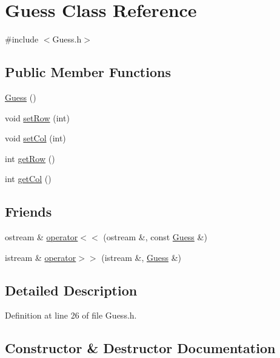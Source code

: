 \hypertarget{class_guess}{}\section{Guess Class Reference}
\label{class_guess}


{\ttfamily \#include $<$Guess.\+h$>$}

\subsection*{Public Member Functions}
\begin{DoxyCompactItemize}
\item 
\hyperlink{class_guess_a34ed64834f2bdb9a6198ec6e5e7bdfc0}{Guess} ()
\item 
void \hyperlink{class_guess_a14824d1a22b6d0cb328adf5b052b9529}{set\+Row} (int)
\item 
void \hyperlink{class_guess_a2283979520b0e7d4922241aa92f0917b}{set\+Col} (int)
\item 
int \hyperlink{class_guess_a9310375abd6a91897d51e0c78eb2d7c7}{get\+Row} ()
\item 
int \hyperlink{class_guess_ad8d68e38d81479d605977331a0e57a0a}{get\+Col} ()
\end{DoxyCompactItemize}
\subsection*{Friends}
\begin{DoxyCompactItemize}
\item 
ostream \& \hyperlink{class_guess_aa9dfccdd4605cf8faa55ddfa8d2c9745}{operator$<$$<$} (ostream \&, const \hyperlink{class_guess}{Guess} \&)
\item 
istream \& \hyperlink{class_guess_a4248aa595b925941de244395ba77ba7c}{operator$>$$>$} (istream \&, \hyperlink{class_guess}{Guess} \&)
\end{DoxyCompactItemize}


\subsection{Detailed Description}


Definition at line 26 of file Guess.\+h.



\subsection{Constructor \& Destructor Documentation}
